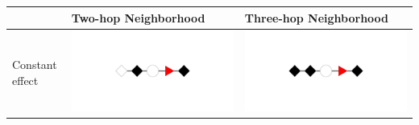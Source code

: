 \documentclass[12pt]{article}
\begin{document}
\begin{table}[h]
\centering
\begin{tabular}{|>{\centering\arraybackslash}m{2.75cm}|>{\centering\arraybackslash}m{5.5cm}|>{\centering\arraybackslash}m{5.5cm}|}
\hline 
& Two-hop Neighborhood & Three-hop Neighborhood \\
\hline
Constant effect  & \includegraphics[scale=.225,clip=true,trim = 13cm 10cm 13cm 10cm]{./images/effect_constant_twohops} &  \includegraphics[scale=.225,clip=true,trim = 13cm 10cm 13cm 10cm]{./images/effect_constant_threehops} \\ \hline 

\end{tabular}
\end{table}
\end{document}
